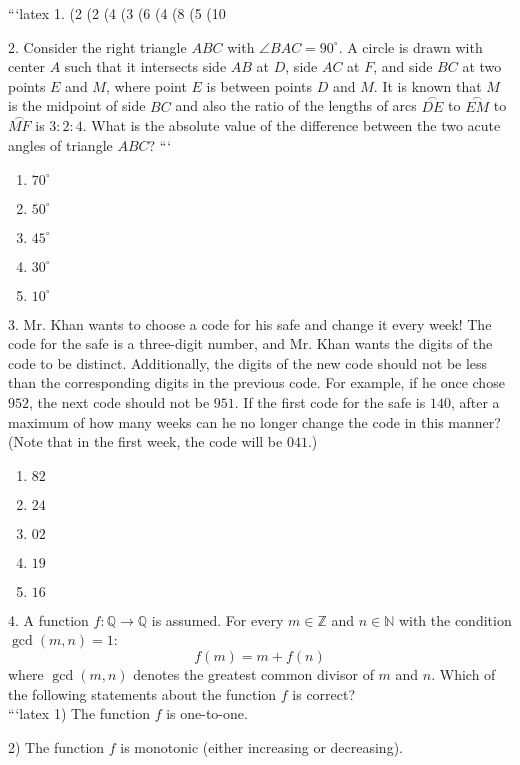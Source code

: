 ```latex
1. (2 (2 (4 (3 (6 (4 (8 (5 (10

2. Consider the right triangle $ABC$ with $\angle BAC = 90^\circ$. A circle is drawn with center $A$ such that it intersects side $AB$ at $D$, side $AC$ at $F$, and side $BC$ at two points $E$ and $M$, where point $E$ is between points $D$ and $M$. It is known that $M$ is the midpoint of side $BC$ and also the ratio of the lengths of arcs $\overset{\frown}{DE}$ to $\overset{\frown}{EM}$ to $\overset{\frown}{MF}$ is $3:2:4$. What is the absolute value of the difference between the two acute angles of triangle $ABC$?
```
\\
\begin{enumerate}
    \item $70^\circ$
    \item $50^\circ$
    \item $45^\circ$
    \item $30^\circ$
    \item $10^\circ$
\end{enumerate}

3. Mr. Khan wants to choose a code for his safe and change it every week! The code for the safe is a three-digit number, and Mr. Khan wants the digits of the code to be distinct. Additionally, the digits of the new code should not be less than the corresponding digits in the previous code. For example, if he once chose $952$, the next code should not be $951$. If the first code for the safe is $140$, after a maximum of how many weeks can he no longer change the code in this manner? (Note that in the first week, the code will be $041$.)
\\
\begin{enumerate}
    \item $82$
    \item $24$
    \item $02$
    \item $19$
    \item $16$
\end{enumerate}

4. A function $f: \mathbb{Q} \to \mathbb{Q}$ is assumed. For every $m \in \mathbb{Z}$ and $n \in \mathbb{N}$ with the condition $\gcd(m, n) = 1$: 
\[ f(m) = m + f(n) \]
where $\gcd(m, n)$ denotes the greatest common divisor of $m$ and $n$. Which of the following statements about the function $f$ is correct?
\\
```latex
1) The function $f$ is one-to-one. 

2) The function $f$ is monotonic (either increasing or decreasing). 

